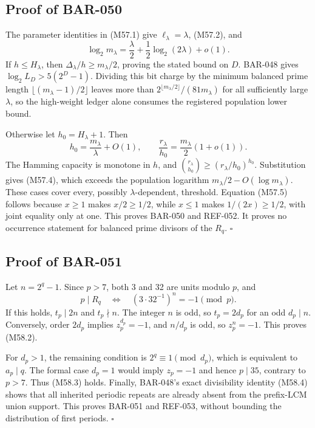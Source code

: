 \documentclass[11pt]{article}
\begin{document}
\subsection{Proof of BAR-050}
\label{proof:BAR-050}

The parameter identities in (M57.1) give
\(\ell_\lambda=\lambda\), (M57.2), and
\[
\log_2m_\lambda
=\frac{\lambda}{2}
+\frac12\log_2(2\lambda)+o(1).
\]
If \(h\le H_\lambda\), then
\(\Delta_\lambda/h\ge m_\lambda/2\), proving the stated bound on \(D\).
BAR-048 gives
\(\log_2L_D>5(2^D-1)\). Dividing this bit charge by the minimum balanced
prime length \(\lfloor(m_\lambda-1)/2\rfloor\) leaves more than
\(2^{\lfloor m_\lambda/2\rfloor}/(81m_\lambda)\) for all sufficiently
large \(\lambda\), so the high-weight ledger alone consumes the registered
population lower bound.

Otherwise let \(h_0=H_\lambda+1\). Then
\[
h_0=\frac{m_\lambda}{\lambda}+O(1),
\qquad
\frac{r_\lambda}{h_0}
=\frac{m_\lambda}{2}(1+o(1)).
\]
The Hamming capacity is monotone in \(h\), and
\(\binom{r_\lambda}{h_0}\ge
(r_\lambda/h_0)^{h_0}\). Substitution gives (M57.4), which exceeds the
population logarithm \(m_\lambda/2-O(\log m_\lambda)\). These cases cover
every, possibly \(\lambda\)-dependent, threshold. Equation (M57.5) follows
because \(x\ge1\) makes \(x/2\ge1/2\), while \(x\le1\) makes
\(1/(2x)\ge1/2\), with joint equality only at one. This proves BAR-050 and
REF-052. It proves no occurrence statement for balanced prime divisors of
the \(R_q\). \(\square\)

\subsection{Proof of BAR-051}
\label{proof:BAR-051}

Let \(n=2^q-1\). Since \(p>7\), both 3 and 32 are units modulo \(p\), and
\[
p\mid R_q
\quad\Longleftrightarrow\quad
(3\cdot32^{-1})^n=-1\pmod p.
\]
If this holds, \(t_p\mid2n\) and \(t_p\nmid n\). The integer \(n\) is odd,
so \(t_p=2d_p\) for an odd \(d_p\mid n\). Conversely, order \(2d_p\)
implies \(z_p^{d_p}=-1\), and \(n/d_p\) is odd, so \(z_p^n=-1\).
This proves (M58.2).

For \(d_p>1\), the remaining condition is
\(2^q\equiv1\pmod{d_p}\), which is equivalent to \(a_p\mid q\).
The formal case \(d_p=1\) would imply \(z_p=-1\) and hence \(p\mid35\),
contrary to \(p>7\). Thus (M58.3) holds. Finally, BAR-048's exact
divisibility identity (M58.4) shows that all inherited periodic repeats are
already absent from the prefix-LCM union support. This proves BAR-051 and
REF-053, without bounding the distribution of first periods. \(\square\)
\end{document}
